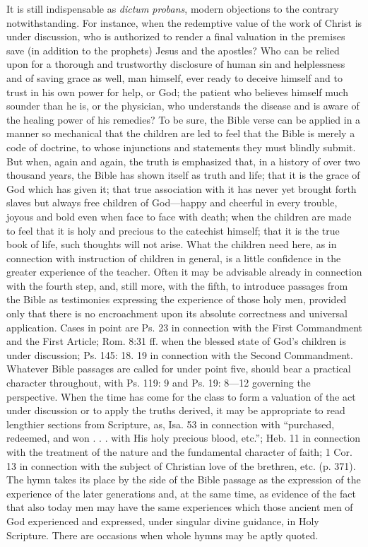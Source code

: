 It is still indispensable as \emph{dictum probans}, modern objections to the contrary notwithstanding. For instance, when the redemptive value of the work of Christ is under discussion, who is authorized to render a final valuation in the premises save (in addition to the prophets) Jesus and the apostles? Who can be relied upon for a thorough and trustworthy disclosure of human sin and helplessness and of saving grace as well, man himself, ever ready to deceive himself and to trust in his own power for help, or God; the patient who believes himself much sounder than he is, or the physician, who understands the disease and is aware of the healing power of his remedies? To be sure, the Bible verse can be applied in a manner so mechanical that the children are led to feel that the Bible is merely a code of doctrine, to whose injunctions and statements they must blindly submit. But when, again and again, the truth is emphasized that, in a history of over two thousand years, the Bible has shown itself as truth and life; that it is the grace of God which has given it; that true association with it has never yet brought forth slaves but always free children of God—happy and cheerful in every trouble, joyous and bold even when face to face with death; when the children are made to feel that it is holy and precious to the catechist himself; that it is the true book of life, such thoughts will not arise. What the children need here, as in connection with instruction of children in general, is a little confidence in the greater experience of the teacher. Often it may be advisable already in connection with the fourth step, and, still more, with the fifth, to introduce passages from the Bible as testimonies expressing the experience of those holy men, provided only that there is no encroachment upon its absolute correctness and universal application. Cases in point are Ps. 23 in connection with the First Commandment and the First Article; Rom. 8:31 ff. when the blessed state of God’s children is under
discussion; Ps. 145: 18. 19 in connection with the Second Commandment. Whatever Bible passages are called for under point five, should bear a practical character throughout, with Ps. 119: 9 and Ps. 19: 8—12 governing the perspective. When the time has come for the class to form a valuation of the act under discussion or to apply the truths derived, it may be appropriate to read lengthier sections from Scripture, as, Isa. 53 in connection with “purchased, redeemed, and won . . . with His holy precious blood, etc.”; Heb. 11 in connection with the treatment of the nature and the fundamental character of faith; 1 Cor. 13 in connection with the subject of Christian love of the brethren, etc. (p. 371). The hymn takes its place by the side of the Bible passage as the expression of the experience of the later generations and, at the same time, as evidence of the fact that also today men may have the same experiences which those ancient men of God experienced and expressed, under singular divine guidance, in Holy Scripture. There are occasions when whole hymns may be aptly quoted.

